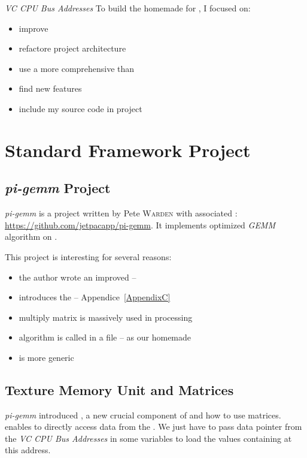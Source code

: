 \emph{VC CPU Bus Addresses}
To build the homemade  for \iBubble, I focused on:
\begin{itemize}
	\item improve 
	\item refactore project architecture
	\item use a more comprehensive  than 
	\item find new \vc{} features
	\item include my source code in  project
\end{itemize}


\section{Standard Framework Project}

\subsection{\emph{pi-gemm} Project}

\emph{pi-gemm} \parencite{refPiGemm} is a project written by Pete \textsc{Warden} with associated : \url{https://github.com/jetpacapp/pi-gemm}. It implements optimized \emph{GEMM} algorithm on \vc.

This project is interesting for several reasons:
\begin{itemize}
	\item the author wrote an improved  -- 
	\item {} introduces the  -- Appendice~\ref{AppendixC}
	\item multiply matrix is massively used in \flow{} processing
	\item {} algorithm is called in a  file -- as our homemade \api
	\item {}  is more generic
\end{itemize}


\subsection{Texture Memory Unit and Matrices}\label{Matrices}

\emph{pi-gemm} introduced , a new crucial component of \vc{} and how to use matrices.  enables \qpu{} to directly access data from the \ram{}. We just have to pass data pointer from the \emph{VC CPU Bus Addresses} in some  variables to load the values containing at this address.

